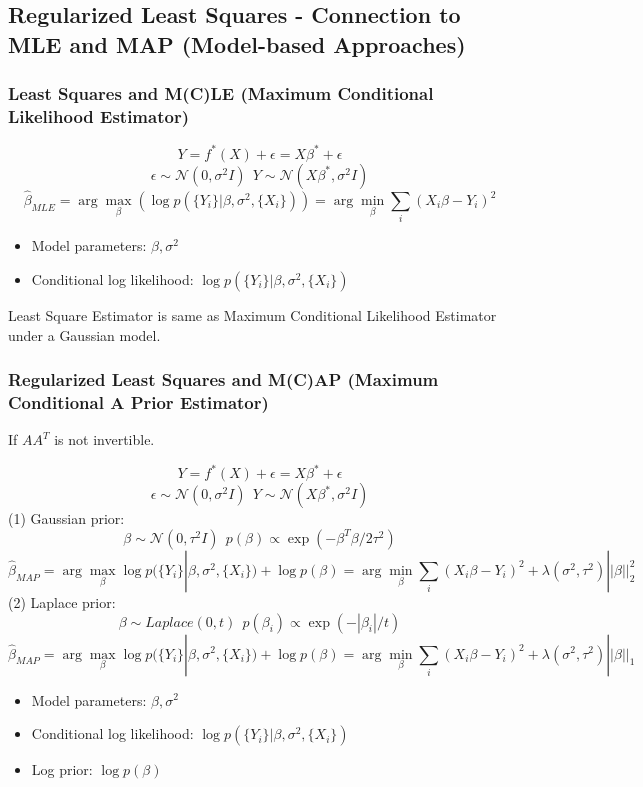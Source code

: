 \documentclass[letterpaper,10pt]{article}
\begin{document}
\subsection{Regularized Least Squares - Connection to MLE and MAP (Model-based Approaches)}

\subsubsection{Least Squares and M(C)LE (Maximum Conditional Likelihood Estimator)}

$$Y=f^*(X)+\epsilon=X\beta^*+\epsilon$$
$$\epsilon \sim \mathcal{N}(0,\sigma^2I)~~Y\sim\mathcal{N}(X\beta^*,\sigma^2I)$$
$$\hat{\beta}_{MLE} = \arg\max_\beta (\log p(\{Y_i\}|\beta,\sigma^2,\{X_i\}))=\arg\min_{\beta}\sum_i(X_i\beta-Y_i)^2$$
\begin{itemize}
	\item Model parameters: $\beta,\sigma^2$
	\item Conditional log likelihood: $\log p(\{Y_i\}|\beta,\sigma^2,\{X_i\})$
\end{itemize}

Least Square Estimator is same as Maximum Conditional Likelihood Estimator under a Gaussian model.

\subsubsection{Regularized Least Squares and M(C)AP (Maximum Conditional A Prior Estimator)}

If $AA^T$ is not invertible.

$$Y=f^*(X)+\epsilon=X\beta^*+\epsilon$$
$$\epsilon \sim \mathcal{N}(0,\sigma^2I)~~Y\sim\mathcal{N}(X\beta^*,\sigma^2I)$$
(1) Gaussian prior:
$$\beta \sim \mathcal{N}(0,\tau^2 I)~~p(\beta) \propto \exp(-\beta^T\beta/2\tau^2)$$
$$\hat{\beta}_{MAP} = \arg\max_\beta \log p(\{Y_i\}|\beta,\sigma^2,\{X_i\}) +\log p(\beta)=\arg\min_{\beta}\sum_i(X_i\beta-Y_i)^2+\lambda(\sigma^2,\tau^2)||\beta||_2^2$$
(2) Laplace prior:
$$\beta \sim Laplace(0,t)~~p(\beta_i) \propto \exp(-|\beta_i|/t)$$
$$\hat{\beta}_{MAP} = \arg\max_\beta \log p(\{Y_i\}|\beta,\sigma^2,\{X_i\}) +\log p(\beta)=\arg\min_{\beta}\sum_i(X_i\beta-Y_i)^2+\lambda(\sigma^2,\tau^2)||\beta||_1$$


\begin{itemize}
	\item Model parameters: $\beta,\sigma^2$
	\item Conditional log likelihood: $\log p(\{Y_i\}|\beta,\sigma^2,\{X_i\})$
	\item Log prior: $\log p(\beta)$
\end{itemize}
\end{document}
